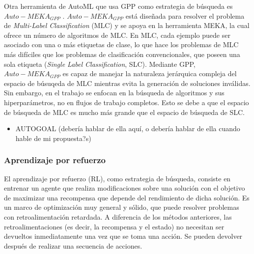 Otra herramienta de AutoML que usa GPP como estrategia de búsqueda es $Auto-MEKA_{GPP}$ \cite{de2018automated}. $Auto-MEKA_{GPP}$ está diseñada para resolver el problema de \textit{Multi-Label Classification} (MLC) y se apoya en la herramienta MEKA, la cual ofrece un número de algoritmos de MLC. En MLC, cada ejemplo puede ser asociado con una o más etiquetas de clase, lo que hace los problemas de MLC más difíciles que los problemas de clasificación convencionales, que poseen una sola etiqueta (\textit{Single Label Classification}, SLC). Mediante GPP, $Auto-MEKA_{GPP}$ es capaz de manejar la naturaleza jerárquica compleja del espacio de búsuqeda de MLC mientras evita la generación de soluciones inválidas. Sin embargo, en el trabajo se enfocan en la búsqueda de algoritmos y sus hiperparámetros, no en flujos de trabajo completos. Esto se debe a que el espacio de búsqueda de MLC es mucho más grande que el espacio de búsqueda de SLC.

\begin{itemize}
	\item AUTOGOAL (debería hablar de ella aquí, o debería hablar de ella cuando hable de mi propuesta?s)
\end{itemize}

\subsubsection{Aprendizaje por refuerzo}


El aprendizaje por refuerzo (RL), como estrategia de búsqueda, consiste en entrenar un agente que realiza modificaciones sobre una solución con el objetivo de maximizar una recompensa que depende del rendimiento de dicha solución. Es un marco de optimización muy general y sólido, que puede resolver problemas con retroalimentación retardada. A diferencia de los métodos anteriores, las retroalimentaciones (es decir, la recompensa y el estado) no necesitan ser devueltos inmediatamente una vez que se toma una acción. Se pueden devolver después de realizar una secuencia de acciones. 


